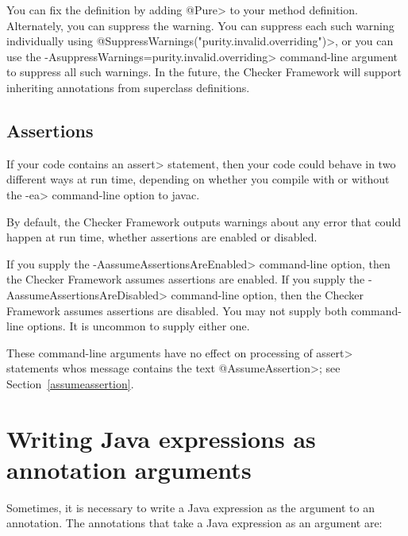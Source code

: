 You can fix the definition by adding \<@Pure> to your method definition.
Alternately, you can suppress the warning.
You can suppress each such warning individually using
\<@SuppressWarnings("purity.invalid.overriding")>,
or you can use the \<-AsuppressWarnings=purity.invalid.overriding>
command-line argument to suppress all such warnings.
In the future, the Checker Framework will support inheriting annotations
from superclass definitions.


\subsection{Assertions\label{type-refinement-assertions}}

If your code contains an \<assert> statement, then your code could behave
in two different ways at run time, depending on whether you compile with or
without the \<-ea> command-line option to javac.

By default, the Checker Framework outputs warnings about any error that
could happen at run time, whether assertions are enabled or disabled.

If you supply the \<-AassumeAssertionsAreEnabled> command-line option, then
the Checker Framework assumes assertions are enabled.  If you supply the
\<-AassumeAssertionsAreDisabled> command-line option, then the Checker
Framework assumes assertions are disabled.  You may not supply both
command-line options.  It is uncommon to supply either one.

These command-line arguments have no effect on processing of \<assert>
statements whos message contains the text \<@AssumeAssertion>; see
Section~\ref{assumeassertion}.


\section{Writing Java expressions as annotation arguments\label{java-expressions-as-arguments}}

Sometimes, it is necessary to write a Java expression as the argument to an
annotation.  The annotations that take a Java
expression as an argument are:

